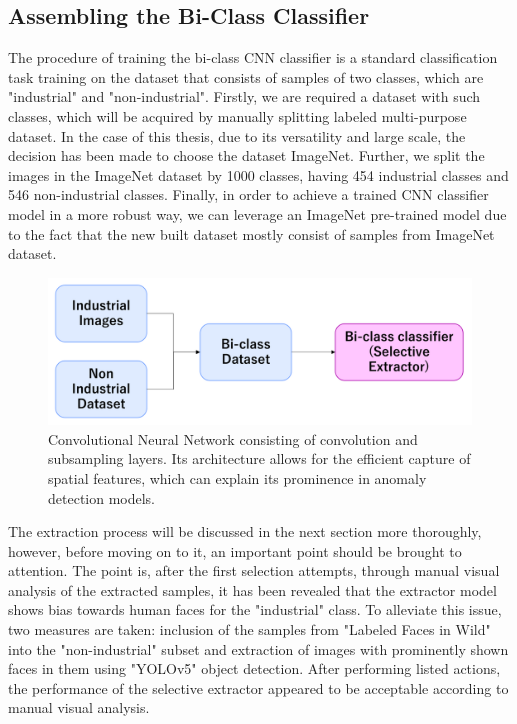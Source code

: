 \subsection{Assembling the Bi-Class Classifier}
\label{bi-class assemble}
The procedure of training the bi-class CNN classifier is a standard classification task training on the dataset that consists of samples of two classes, which are "industrial" and "non-industrial". Firstly, we are required a dataset with such classes, which will be acquired by manually splitting labeled multi-purpose dataset. In the case of this thesis, due to its versatility and large scale, the decision has been made to choose the dataset ImageNet. Further, we split the images in the ImageNet dataset by 1000 classes, having 454 industrial classes and 546 non-industrial classes. Finally, in order to achieve a trained CNN classifier model in a more robust way, we can leverage an ImageNet pre-trained model due to the fact that the new built dataset mostly consist of samples from ImageNet dataset.

\begin{figure}[h]
	\begin{center}
		\includegraphics[width=1.0\linewidth]{Chapter_3/cnn_train_data.png}
	\end{center}
	\caption{Convolutional Neural Network consisting of convolution and subsampling layers. Its architecture allows for the efficient capture of spatial features, which can explain its prominence in anomaly detection models.}
	\label{fig:cnn}
\end{figure} 	

The extraction process will be discussed in the next section more thoroughly, however, before moving on to it, an important point should be brought to attention. The point is, after the first selection attempts, through manual visual analysis of the extracted samples, it has been revealed that the extractor model shows bias towards human faces for the "industrial" class. To alleviate this issue, two measures are taken: inclusion of the samples from "Labeled Faces in Wild" into the "non-industrial" subset and extraction of images with prominently shown faces in them using "YOLOv5" object detection. After performing listed actions, the performance of the selective extractor appeared to be acceptable according to manual visual analysis.

